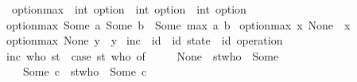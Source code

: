 \begin{isabellebody}%
\isamarkupfalse%
\ option{\isacharunderscore}max\ {\isacharcolon}{\isacharcolon}\ {\isachardoublequoteopen}int\ option\ {\isasymRightarrow}\ int\ option\ {\isasymRightarrow}\ int\ option{\isachardoublequoteclose}\ \ \isanewline
{\isachardoublequoteopen}option{\isacharunderscore}max\ {\isacharparenleft}Some\ a{\isacharparenright}\ {\isacharparenleft}Some\ b{\isacharparenright}\ {\isacharequal}\ Some\ {\isacharparenleft}max\ a\ b{\isacharparenright}{\isachardoublequoteclose}\ {\isacharbar}\isanewline
{\isachardoublequoteopen}option{\isacharunderscore}max\ x\ None\ {\isacharequal}\ x{\isachardoublequoteclose}\ {\isacharbar}\isanewline
{\isachardoublequoteopen}option{\isacharunderscore}max\ None\ y\ {\isacharequal}\ y{\isachardoublequoteclose}\isanewline
\isanewline
{}\isamarkupfalse%
\ inc\ {\isacharcolon}{\isacharcolon}\ {\isachardoublequoteopen}{\isacharprime}id\ {\isasymRightarrow}\ {\isacharparenleft}{\isacharprime}id\ state{\isacharparenright}\ {\isasymRightarrow}\ {\isacharparenleft}{\isacharprime}id\ operation{\isacharparenright}{\isachardoublequoteclose}\ \isanewline
{\isachardoublequoteopen}inc\ who\ st\ {\isacharequal}\ {\isacharparenleft}case\ {\isacharparenleft}st\ who{\isacharparenright}\ of\ \isanewline
\ \ \ \ None\ {\isasymRightarrow}\ st{\isacharparenleft}who\ {\isacharcolon}{\isacharequal}\ Some\ {}{\isacharparenright}\isanewline
\ \ {\isacharbar}\ Some\ c\ {\isasymRightarrow}\ st{\isacharparenleft}who\ {\isacharcolon}{\isacharequal}\ Some\ {\isacharparenleft}c\ {\isacharplus}\ {}{\isacharparenright}{\isacharparenright}{\isacharparenright}{\isachardoublequoteclose}
\end{isabellebody}
